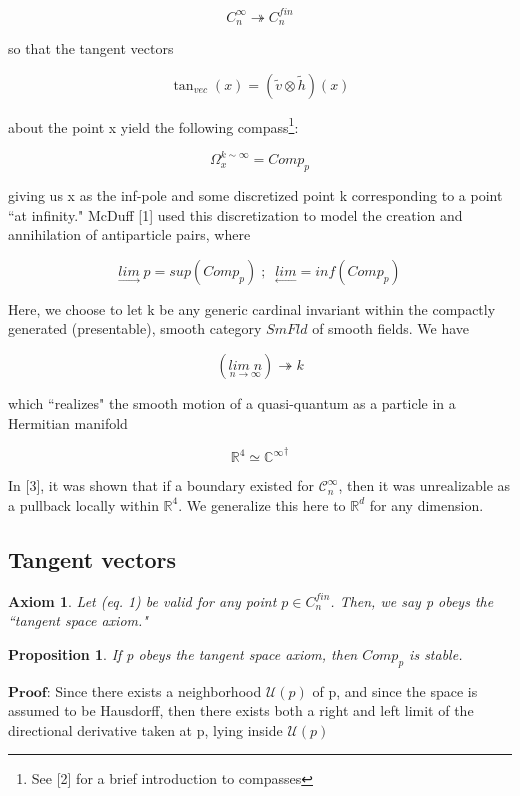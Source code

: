 \documentclass{article}
\newtheorem{pp}{Proposition}
\newtheorem{ax}{Axiom}
\begin{document}
	$$C_n^\infty \twoheadrightarrow C_n^{fin}$$
	
	so that the tangent vectors
	
	\begin{equation}
		\tan_{vec}(x) = (\tilde{v} \otimes \tilde{h})(x)
	\end{equation}
	
	 
	
	about the point x yield the following compass\footnote{See [2] for a brief introduction to compasses}:
	
	$$\Omega_x^{k\sim \infty} = Comp_p$$
	
	giving us x as the inf-pole and some discretized point k corresponding to a point ``at infinity." McDuff [1] used this discretization to model the creation and annihilation of antiparticle pairs, where 
	
	$$\underset{\to}{lim}\;p = sup(Comp_p) \; ; \; \; \underset{\leftarrow}{lim} = inf(Comp_p)$$
	
	Here, we choose to let k be any generic cardinal invariant within the compactly generated (presentable), smooth category $SmFld$ of smooth fields. We have 
	
	$$(\underset{n \to \infty}{lim \; n}) \twoheadrightarrow k $$
	
	which ``realizes" the smooth motion of a quasi-quantum as a particle in a Hermitian manifold
	
	$$\mathbb{R}^4 \simeq {\mathbb{C}^\infty}^\dagger $$
	
	In [3], it was shown that if a boundary existed for $\mathcal{C}_n^\infty$, then it was unrealizable as a pullback locally within $\mathbb{R}^4$. We generalize this here to $\mathbb{R}^d$ for any dimension.
	
	\subsection{Tangent vectors}
	
	\begin{ax}
			Let (eq. 1) be valid for any point $p \in C_n^{fin}$. Then, we say p obeys the ``tangent space axiom."
	\end{ax}

	\begin{pp}
		If p obeys the tangent space axiom, then $Comp_p$ is stable.
	\end{pp}
	
	$\mathbf{Proof}$: Since there exists a neighborhood $\mathcal{U}(p)$ of p, and since the space is assumed to be Hausdorff, then there exists both a right and left limit of the directional derivative taken at p, lying inside $\mathcal{U}(p)$
	
\end{document}
